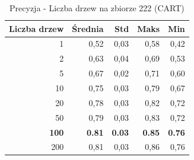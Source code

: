 \begin{table}[htbp]
\centering
\small
\setlength{\tabcolsep}{6pt}
\renewcommand{\arraystretch}{1.2}
\caption{Precyzja - Liczba drzew na zbiorze 222 (CART)}
\label{tab:CART_tree_count_222_precision}
\begin{tabular}{r|r|r|r|r}
\toprule
Liczba drzew & Średnia & Std & Maks & Min \\
\hline
1 & 0,52 & 0,03 & 0,58 & 0,42 \\
2 & 0,63 & 0,04 & 0,69 & 0,53 \\
5 & 0,67 & 0,02 & 0,71 & 0,60 \\
10 & 0,75 & 0,03 & 0,79 & 0,67 \\
20 & 0,78 & 0,03 & 0,82 & 0,72 \\
50 & 0,79 & 0,03 & 0,83 & 0,72 \\
\textbf{100} & \textbf{0.81} & \textbf{0.03} & \textbf{0.85} & \textbf{0.76} \\
200 & 0,81 & 0,03 & 0,86 & 0,76 \\
\bottomrule
\end{tabular}
\end{table}